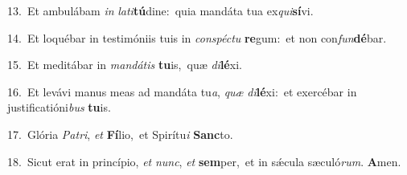 {\numbfont\textcolor{\numbcolor}{13.}}~Et ambulábam \textit{in} \textit{la}\-\textit{ti}\textbf{tú}dine:~\star quia mandáta tua ex\-\textit{qui}\-\textbf{sí}vi.\par
{\numbfont\textcolor{\numbcolor}{14.}}~Et loquébar in testimóniis tuis in \textit{con}\-\textit{spéc}\textit{tu} \textbf{re}\-gum:~\star et non con\-\textit{fun}\-\textbf{dé}bar.\par
{\numbfont\textcolor{\numbcolor}{15.}}~Et meditábar in \textit{man}\-\textit{dá}\textit{tis} \textbf{tu}\-is,~\star quæ \textit{di}\-\textbf{lé}xi.\par
{\numbfont\textcolor{\numbcolor}{16.}}~Et levávi manus meas ad mandáta tu\-\textit{a}\-, \textit{quæ} \textit{di}\-\textbf{lé}xi:~\star et exercébar in justificatióni\textit{bus} \textbf{tu}\-is.\par
{\numbfont\textcolor{\numbcolor}{17.}}~Glória \textit{Pa}\-\textit{tri}, \textit{et} \textbf{Fí}\-lio,~\star et Spirítu\textit{i} \textbf{Sanc}\-to.\par
{\numbfont\textcolor{\numbcolor}{18.}}~Sicut erat in princípio, \textit{et} \textit{nunc}\-, \textit{et} \textbf{sem}\-per,~\star et in sǽcula sæculó\-\textit{rum}\-. \textbf{A}\-men.\par
